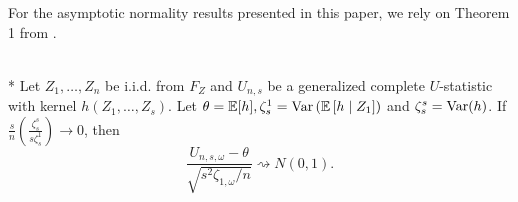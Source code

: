 For the asymptotic normality results presented in this paper, we rely on Theorem 1 from \citet{peng_rates_2022}.
\begin{boxD}
    \begin{thm}\label{thm:peng1}\mbox{}\\*
        Let $Z_1, \ldots, Z_n$ be i.i.d. from $F_Z$ and $U_{n, s}$ be a generalized complete $U$-statistic with kernel $h\left(Z_1, \ldots, Z_s\right)$. 
        Let $\theta=\mathbb{E}[h], \zeta_{s}^{1}=\text{Var}\left(\mathbb{E}\left[h \mid Z_1\right]\right)$ and $\zeta_{s}^{s}=\text{Var}(h)$. If $\frac{s}{n} \left(\frac{\zeta_{s}^{s}}{s \zeta_{s}^{1}}\right) \rightarrow 0$, then
        \begin{equation}
            \frac{U_{n, s, \omega}-\theta}{\sqrt{s^2 \zeta_{1, \omega} / n}} \rightsquigarrow N(0,1) .
        \end{equation}
    \end{thm}    
\end{boxD}
